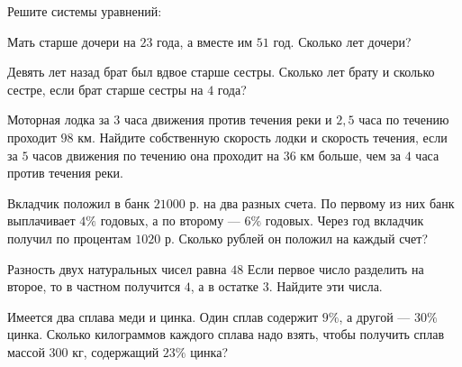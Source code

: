 \begin{class}[number=4]
	\begin{listofex}
		\item Решите системы уравнений:
		\begin{itasks}[2]
			\task {}
			\task {}
			\task {}
			\task {}
			\task {}
			\task {}
			\task {}
			\task {}
		\end{itasks}
		\item Мать старше дочери на \( 23 \) года, а вместе им \( 51 \) год. Сколько лет дочери?
		\item Девять лет назад брат был вдвое старше сестры. Сколько лет брату и сколько сестре, если брат старше сестры на \( 4 \) года?
		\item Моторная лодка за \( 3 \) часа движения против течения реки и \( 2,5 \) часа по течению проходит \( 98 \) км. Найдите собственную скорость лодки и скорость течения, если за \( 5 \) часов движения по течению она проходит на \( 36 \) км больше, чем за \( 4 \) часа против течения реки.
		\item Вкладчик положил в банк \( 21000 \) р. на два разных счета. По первому из них	банк выплачивает \( 4\% \) годовых, а по второму --- \( 6\% \) годовых. Через год вкладчик получил по процентам \( 1020 \) р. Сколько рублей он положил на каждый счет?
		\item Разность двух натуральных чисел равна \( 48 \) Если первое число разделить на второе, то в частном получится \( 4 \), а в остатке \( 3 \). Найдите эти числа.
		\item Имеется два сплава меди и цинка. Один сплав содержит \( 9\% \), а другой --- \( 30\% \) цинка. Сколько килограммов каждого сплава надо взять, чтобы получить сплав массой \( 300 \) кг, содержащий \( 23\% \) цинка?
	\end{listofex}
\end{class}

